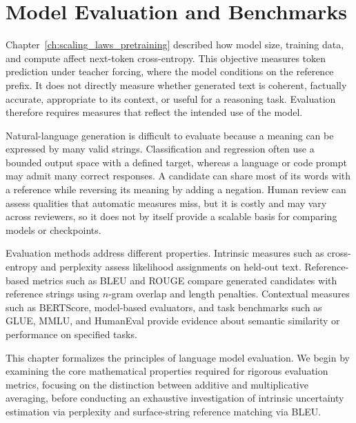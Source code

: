 \documentclass[../../main.tex]{subfiles}
\begin{document}
\chapter{Model Evaluation and Benchmarks}
\label{ch:evaluation_metrics_benchmarks}

Chapter~\ref{ch:scaling_laws_pretraining} described how model size, training data, and compute affect next-token cross-entropy. This objective measures token prediction under teacher forcing, where the model conditions on the reference prefix. It does not directly measure whether generated text is coherent, factually accurate, appropriate to its context, or useful for a reasoning task. Evaluation therefore requires measures that reflect the intended use of the model.

Natural-language generation is difficult to evaluate because a meaning can be expressed by many valid strings. Classification and regression often use a bounded output space with a defined target, whereas a language or code prompt may admit many correct responses. A candidate can share most of its words with a reference while reversing its meaning by adding a negation. Human review can assess qualities that automatic measures miss, but it is costly and may vary across reviewers, so it does not by itself provide a scalable basis for comparing models or checkpoints.

Evaluation methods address different properties. Intrinsic measures such as cross-entropy and perplexity assess likelihood assignments on held-out text. Reference-based metrics such as BLEU and ROUGE compare generated candidates with reference strings using $n$-gram overlap and length penalties. Contextual measures such as BERTScore, model-based evaluators, and task benchmarks such as GLUE, MMLU, and HumanEval provide evidence about semantic similarity or performance on specified tasks.

This chapter formalizes the principles of language model evaluation. We begin by examining the core mathematical properties required for rigorous evaluation metrics, focusing on the distinction between additive and multiplicative averaging, before conducting an exhaustive investigation of intrinsic uncertainty estimation via perplexity and surface-string reference matching via BLEU.

\clearpage
\end{document}
